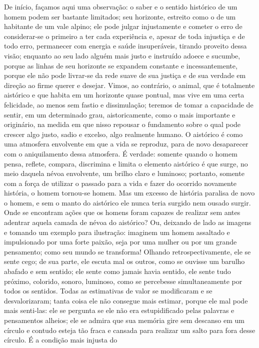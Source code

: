 De início, façamos aqui uma observação: o saber e o sentido histórico de
um homem podem ser bastante limitados; seu horizonte, estreito como o de
um habitante de um vale alpino; ele pode julgar injustamente e cometer o
erro de considerar-se o primeiro a ter cada experiência e, apesar de
toda injustiça e de todo erro, permanecer com energia e saúde
insuperáveis, tirando proveito dessa visão; enquanto ao seu lado alguém
mais justo e instruído adoece e sucumbe, porque as linhas de seu
horizonte se expandem constante e incessantemente, porque ele não pode
livrar-se da rede suave de sua justiça e de sua verdade em direção ao
firme querer e desejar. Vimos, ao contrário, o animal, que é totalmente
aistórico e que habita em um horizonte quase pontual, mas vive em uma
certa felicidade, ao menos sem fastio e dissimulação; teremos de tomar a
capacidade de sentir, em um determinado grau, aistoricamente, como o
mais importante e originário, na medida em que nisso repousar o
fundamento sobre o qual pode crescer algo justo, sadio e excelso, algo
realmente humano. O aistórico é como uma atmosfera envolvente em que a
vida se reproduz, para de novo desaparecer com o aniquilamento dessa
atmosfera. É verdade: somente quando o homem pensa, reflete, compara,
discrimina e limita o elemento aistórico é que surge, no meio daquela
névoa envolvente, um brilho claro e luminoso; portanto, somente com a
força de utilizar o passado para a vida e fazer do ocorrido novamente
história, o homem tornou-se homem. Mas um excesso de história paralisa
de novo o homem, e sem o manto do aistórico ele nunca teria surgido nem
ousado surgir. Onde se encontram ações que os homens foram capazes de
realizar sem antes adentrar aquela camada de névoa do aistórico? Ou,
deixando de lado as imagens e tomando um exemplo para ilustração:
imaginem um homem assaltado e impulsionado por uma forte paixão, seja
por uma mulher ou por um grande pensamento; como seu mundo se
transforma! Olhando retrospectivamente, ele se sente cego; de sua parte,
ele escuta mal os outros, como se ouvisse um barulho abafado e sem
sentido; ele sente como jamais havia sentido, ele sente tudo próximo,
colorido, sonoro, luminoso, como se percebesse simultaneamente por todos
os sentidos. Todas as estimativas de valor se modificaram e se
desvalorizaram; tanta coisa ele não consegue mais estimar, porque ele
mal pode mais senti-las: ele se pergunta se ele não era estupidificado
pelas palavras e pensamentos alheios; ele se admira que sua memória gire
sem descanso em um círculo e contudo esteja tão fraca e cansada para
realizar um salto para fora desse círculo. É a condição mais injusta do
